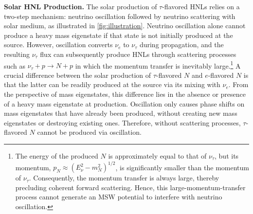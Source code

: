 \documentclass[aps,prd,twocolumn,preprintnumbers,superscriptaddress,nofootinbib]{revtex4-1}
\begin{document}
\textbf{Solar HNL Production.}
\noindent
The solar production of $\tau$-flavored HNLs relies on a two-step mechanism: neutrino oscillation followed by neutrino scattering
with solar medium, as illustrated in \cref{fig:illustration}.
Neutrino oscillation alone cannot produce a heavy mass eigenstate
if that state is not initially produced at the source. However, oscillation
converts $\nu_{e}$ to $\nu_{\tau}$ during propagation, and the resulting
$\nu_{\tau}$ flux can subsequently produce HNLs through scattering
processes such as $\nu_{\tau}+p\to N+p$ in which the momentum
transfer is inevitably large.\footnote{The energy of the produced $N$ is approximately equal to that
of $\nu_{\tau}$, but its momentum, $p_{N}\approx(E_{\nu}^{2}-m_{N}^{2})^{1/2}$,
is significantly smaller than the momentum of $\nu_{\tau}$. Consequently,
the momentum transfer is always large, thereby precluding coherent
forward scattering. Hence, this large-momentum-transfer process cannot generate an MSW potential to interfere with neutrino oscillation.} A crucial difference between the solar production of $\tau$-flavored $N$
and $e$-flavored $N$ is that the latter can be readily
produced at the source via its mixing with $\nu_{e}$. From the perspective of mass
eigenstates, this difference lies in the absence or presence of a heavy
mass eigenstate at production. Oscillation only causes phase shifts
on mass eigenstates that have already been produced, without creating
new mass eigenstates or destroying existing ones. Therefore, without
scattering processes,  $\tau$-flavored $N$ cannot be produced via oscillation.
\end{document}
